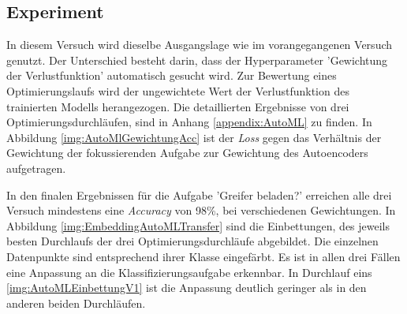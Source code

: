 	\subsection{Experiment}
	\label{subsec:AutoMLExperiment}
	In diesem Versuch wird dieselbe Ausgangslage wie im vorangegangenen Versuch genutzt. Der Unterschied besteht darin, dass der Hyperparameter 'Gewichtung der Verlustfunktion' automatisch gesucht wird. Zur Bewertung eines Optimierungslaufs wird der ungewichtete Wert der Verlustfunktion des trainierten Modells herangezogen. Die detaillierten Ergebnisse von drei Optimierungsdurchläufen, sind in Anhang \ref{appendix:AutoML} zu finden. In Abbildung \ref{img:AutoMlGewichtungAcc} ist der \textit{Loss} gegen das Verhältnis der Gewichtung der fokussierenden Aufgabe zur Gewichtung des Autoencoders aufgetragen.  
	
	 In den finalen Ergebnissen für die Aufgabe 'Greifer beladen?' erreichen alle drei Versuch mindestens eine \textit{Accuracy} von 98\%, bei verschiedenen Gewichtungen. In Abbildung \ref{img:EmbeddingAutoMLTransfer} sind die Einbettungen, des jeweils besten Durchlaufs der drei Optimierungsdurchläufe abgebildet. Die einzelnen Datenpunkte sind entsprechend ihrer Klasse eingefärbt. Es ist in allen drei Fällen eine Anpassung an die Klassifizierungsaufgabe erkennbar. In Durchlauf eins \ref{img:AutoMLEinbettungV1} ist die Anpassung deutlich geringer als in den anderen beiden Durchläufen.
	
